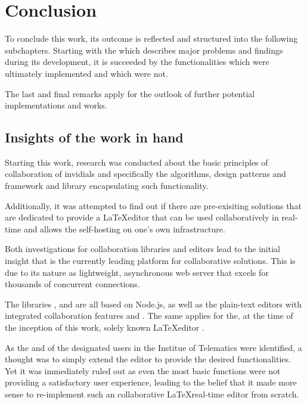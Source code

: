 \chapter{Conclusion}
To conclude this work, its outcome is reflected and structured into the following subchapters. Starting with the  which describes major problems and findings during its development, it is succeeded by the functionalities which were ultimately implemented and which were not. 

The last and final remarks apply for the outlook of further potential implementations and works.

\section{Insights of the work in hand}
\label{sec:work-insights}
Starting this work, research was conducted about the basic principles of collaboration of invidials and specifically the algorithms, design patterns and framework and library encapsulating such functionality.

Additionally, it was attempted to find out if there are pre-exisiting solutions that are dedicated to provide a \LaTeX editor that can be used collaboratively in real-time and allows the self-hosting on one's own infrastructure.

Both investigations for collaboration libraries and editors lead to the initial insight that  is the currently leading platform for collaborative solutions. This is due to its nature as light\-weight, asynchronous web server that excels for thousands of concurrent connections.

The  libraries ,  and  are all based on Node.js, as well as the plain-text editors with integrated collaboration features  and . The same applies for the, at the time of the inception of this work, solely known \LaTeX editor .

As the  and  of the designated users in the Institue of Telematics were identified, a thought was to simply extend the  editor to provide the desired functionalities. Yet it was immediately ruled out as even the most basic functions were not providing a satisfactory user experience, leading to the belief that it made more sense to re-implement such an collaborative \LaTeX real-time editor from scratch.

